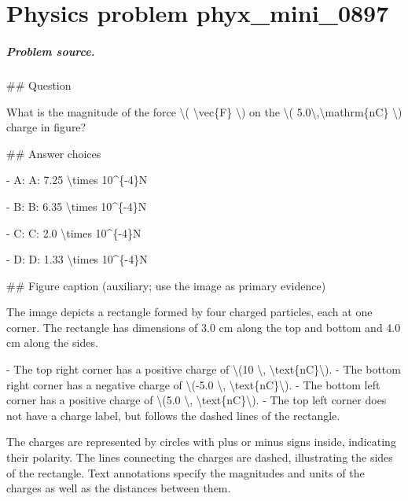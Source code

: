 
\chapter{Physics problem phyx\_mini\_0897}
\label{ch:PhyXMiniProblems_problem_phyx_mini_0897}

\paragraph{Problem source.}
\#\# Question

What is the magnitude of the force \textbackslash{}( \textbackslash{}vec\{F\} \textbackslash{}) on the \textbackslash{}( 5.0\textbackslash{},\textbackslash{}mathrm\{nC\} \textbackslash{}) charge in figure?

\#\# Answer choices

- A: A: 7.25 \textbackslash{}times 10\textasciicircum{}\{-4\}N

- B: B: 6.35 \textbackslash{}times 10\textasciicircum{}\{-4\}N

- C: C: 2.0 \textbackslash{}times 10\textasciicircum{}\{-4\}N

- D: D: 1.33 \textbackslash{}times 10\textasciicircum{}\{-4\}N

\#\# Figure caption (auxiliary; use the image as primary evidence)

The image depicts a rectangle formed by four charged particles, each at one corner. The rectangle has dimensions of 3.0 cm along the top and bottom and 4.0 cm along the sides. 

- The top right corner has a positive charge of \textbackslash{}(10 \textbackslash{}, \textbackslash{}text\{nC\}\textbackslash{}).
- The bottom right corner has a negative charge of \textbackslash{}(-5.0 \textbackslash{}, \textbackslash{}text\{nC\}\textbackslash{}).
- The bottom left corner has a positive charge of \textbackslash{}(5.0 \textbackslash{}, \textbackslash{}text\{nC\}\textbackslash{}).
- The top left corner does not have a charge label, but follows the dashed lines of the rectangle.

The charges are represented by circles with plus or minus signs inside, indicating their polarity. The lines connecting the charges are dashed, illustrating the sides of the rectangle. Text annotations specify the magnitudes and units of the charges as well as the distances between them.

